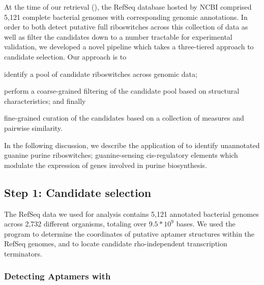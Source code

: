 At the time of our retrieval (\fnaRetrievalTime), the RefSeq database hosted by
NCBI comprised 5,121 complete bacterial genomes with corresponding genomic
annotations. In order to both detect putative full riboswitches across this
collection of data as well as filter the candidates down to a number tractable for
experimental validation, we developed a novel pipeline which takes a three-tiered
approach to candidate selection. Our approach is to
\begin{inparaenum}[\em 1\upshape)]
\item identify a pool of candidate riboswitches across genomic data;
\item perform a coarse-grained filtering of the candidate pool based on structural
characteristics; and finally
\item fine-grained curation of the candidates based on a collection of measures
and pairwise similarity.
\end{inparaenum}

In the following discussion, we describe the application of \rfinder to identify unannotated guanine purine riboswitches; guanine-sensing cis-regulatory elements which modulate the expression of genes involved in purine biosynthesis.

\subsection{Step 1: Candidate selection}
\label{subsec:rfinder:selection}

The RefSeq data we used for analysis contains 5,121 annotated bacterial genomes across 2,732 different organisms, totaling over $9.5 * 10^9$ bases. We used the program \infernal to determine the coordinates of putative aptamer structures within the RefSeq genomes, and \tthp to locate candidate rho-independent transcription terminators.

\subsubsection{Detecting Aptamers with \infernal}
\label{subsubsec:rfinder:infernal}

